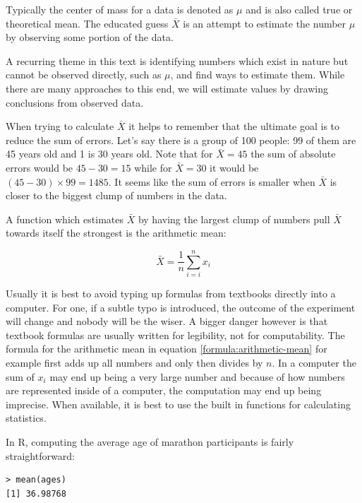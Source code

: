 \documentclass{tufte-book} %
\begin{document}
Typically the center of mass for a data is  denoted as $\mu$ and is also called true or theoretical mean. The educated guess $\bar{X}$ is an attempt to estimate the number $\mu$ by observing some portion of the data. 

\begin{tcolorbox}
	A recurring theme in this text is identifying numbers which exist in nature but cannot be observed directly, such as $\mu$, and find ways to estimate them. While there are many approaches to this end, we will estimate values by drawing conclusions from observed data.
\end{tcolorbox}

When trying to calculate $\bar{X}$ it helps to remember that the ultimate goal is to reduce the sum of errors. Let's say there is a group of 100 people: 99 of them are 45 years old and 1 is 30 years old. Note that for $\bar{X} = 45$ the sum of absolute errors would be $45 - 30 = 15$ while for $\bar{X} = 30$ it would be $(45 - 30) \times 99 = 1485$. It seems like the sum of errors is smaller when $\bar{X}$ is closer to the biggest clump of numbers in the data.

A function which estimates $\bar{X}$ by having the largest clump of numbers pull $\bar{X}$ towards itself the strongest is the arithmetic mean:

\begin{equation} \label{formula:arithmetic-mean}
	\bar{X} = \frac{1}{n} \sum_{i=i}^{n} x_i
\end{equation}

\begin{tcolorbox}
	Usually it is best to avoid typing up formulas from textbooks directly into a computer. For one, if a subtle typo is introduced, the outcome of the experiment will change and nobody will be the wiser. A bigger danger however is that textbook formulas are usually written for legibility, not for computability. The formula for the arithmetic mean in equation \ref{formula:arithmetic-mean} for example first adds up all numbers and only then divides by $n$. In a computer the sum of $x_i$ may end up being a very large number and because of how numbers are represented inside of a computer, the computation may end up being imprecise. When available, it is best to use the built in functions for calculating statistics.
\end{tcolorbox}

In R, computing the average age of marathon participants is fairly straightforward:

\begin{Verbatim}
> mean(ages)
[1] 36.98768
\end{Verbatim}
\end{document}
